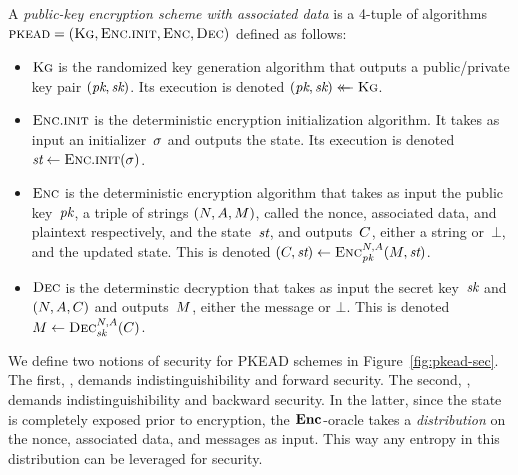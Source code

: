 \label{sec:pkead}

\begin{definition}[PKEAD]\rm
  A \emph{public-key encryption scheme with associated data} is a 4-tuple of
  algorithms $\textsc{pkead} = (\textsc{Kg}, \textsc{Enc}.\textsc{init}, \textsc{Enc}, \textsc{Dec})$ defined as follows:
  \begin{itemize}
    \item $\textsc{Kg}$ is the randomized key generation algorithm that outputs a
      public/private key pair $(\textit{pk}, \textit{sk})$.
      Its execution is denoted $(\textit{pk}, \textit{sk}) \mathrel{\leftarrow\mkern-14mu\leftarrow} \textsc{Kg}$.

    \item $\textsc{Enc}.\textsc{init}$ is the deterministic encryption initialization
      algorithm. It takes as input an initializer~$\sigma$ and outputs the state.
      Its execution is denoted $\textit{st} \gets \textsc{Enc}.\textsc{init}(\sigma)$.

    \item $\textsc{Enc}$ is the deterministic encryption algorithm that takes as input the
      public key~$\textit{pk}$, a triple of strings $(N, A, M)$, called the
      nonce, associated data, and plaintext respectively, and the state~$\textit{st}$, and
      outputs~$C$, either a string or~$\bot$, and the updated state.
      This is denoted $(C, \textit{st}) \gets \textsc{Enc}_{\textit{pk}}^{N,A}(M, \textit{st})$.

    \item $\textsc{Dec}$ is the determinstic decryption that takes as input the secret
      key~$\textit{sk}$ and $(N, A, C)$ and outputs~$M$, either the
      message or $\bot$.
      This is denoted $M \gets \textsc{Dec}_{\textit{sk}}^{N,A}(C)$.
      \dqed
  \end{itemize}
\end{definition}
%

We define two notions of security for PKEAD schemes in
Figure~\ref{fig:pkead-sec}.
%
The first, \fwdpke, demands indistinguishibility and forward security.
The second, \bwdpke, demands indistinguishibility and backward security. In the
latter, since the state is completely exposed prior to encryption, the
$\mathbf{Enc}\hspace{0.5pt}$-oracle takes a \emph{distribution} on the nonce, associated data, and
messages as input. This way any entropy in this distribution can be leveraged
for security.

